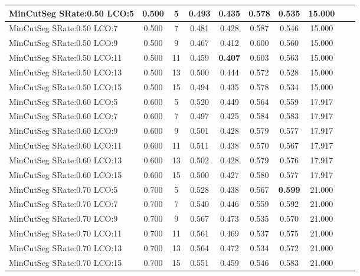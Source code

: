 \documentclass{article}
\begin{document}
\begin{longtable}[c]{|l|c|c|c|c|c|c|c|c|c|}
 MinCutSeg SRate:0.50 LCO:5 & 0.500 & 5 & 0.493 & 0.435 & 0.578 & 0.535 & 15.000  \\ \hline 
 MinCutSeg SRate:0.50 LCO:7 & 0.500 & 7 & 0.481 & 0.428 & 0.587 & 0.546 & 15.000  \\ \hline 
 MinCutSeg SRate:0.50 LCO:9 & 0.500 & 9 & 0.467 & 0.412 & 0.600 & 0.560 & 15.000  \\ \hline 
 MinCutSeg SRate:0.50 LCO:11 & 0.500 & 11 & 0.459 & \cellcolor{gray!20} \textbf{0.407} & 0.603 & 0.563 & 15.000  \\ \hline 
 MinCutSeg SRate:0.50 LCO:13 & 0.500 & 13 & 0.500 & 0.444 & 0.572 & 0.528 & 15.000  \\ \hline 
 MinCutSeg SRate:0.50 LCO:15 & 0.500 & 15 & 0.494 & 0.435 & 0.578 & 0.534 & 15.000  \\ \hline 
 MinCutSeg SRate:0.60 LCO:5 & 0.600 & 5 & 0.520 & 0.449 & 0.564 & 0.559 & 17.917  \\ \hline 
 MinCutSeg SRate:0.60 LCO:7 & 0.600 & 7 & 0.497 & 0.425 & 0.584 & 0.583 & 17.917  \\ \hline 
 MinCutSeg SRate:0.60 LCO:9 & 0.600 & 9 & 0.501 & 0.428 & 0.579 & 0.577 & 17.917  \\ \hline 
 MinCutSeg SRate:0.60 LCO:11 & 0.600 & 11 & 0.511 & 0.438 & 0.570 & 0.567 & 17.917  \\ \hline 
 MinCutSeg SRate:0.60 LCO:13 & 0.600 & 13 & 0.502 & 0.428 & 0.579 & 0.576 & 17.917  \\ \hline 
 MinCutSeg SRate:0.60 LCO:15 & 0.600 & 15 & 0.500 & 0.427 & 0.580 & 0.577 & 17.917  \\ \hline 
 MinCutSeg SRate:0.70 LCO:5 & 0.700 & 5 & 0.528 & 0.438 & 0.567 & \cellcolor{gray!20} \textbf{0.599} & 21.000  \\ \hline 
 MinCutSeg SRate:0.70 LCO:7 & 0.700 & 7 & 0.540 & 0.446 & 0.559 & 0.592 & 21.000  \\ \hline 
 MinCutSeg SRate:0.70 LCO:9 & 0.700 & 9 & 0.567 & 0.473 & 0.535 & 0.570 & 21.000  \\ \hline 
 MinCutSeg SRate:0.70 LCO:11 & 0.700 & 11 & 0.561 & 0.469 & 0.537 & 0.575 & 21.000  \\ \hline 
 MinCutSeg SRate:0.70 LCO:13 & 0.700 & 13 & 0.564 & 0.472 & 0.534 & 0.572 & 21.000  \\ \hline 
 MinCutSeg SRate:0.70 LCO:15 & 0.700 & 15 & 0.551 & 0.459 & 0.546 & 0.583 & 21.000  \\ \hline 
 \end{longtable} 

\newpage
\end{document}
